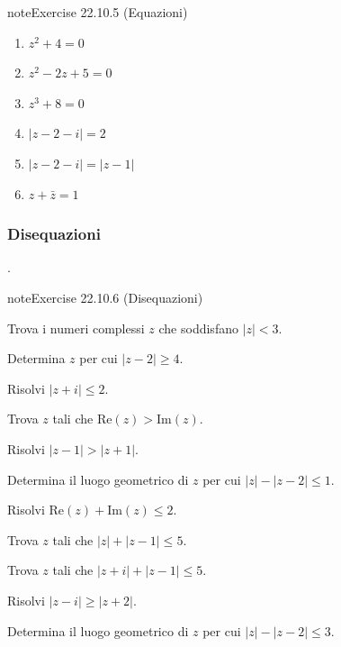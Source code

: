 \documentclass[letterpaper,10pt,italian]{jupyterBook}
\begin{document}
\begin{sphinxadmonition}{note}{Exercise 22.10.5 (Equazioni)}
\begin{enumerate}
\item {} 
\sphinxAtStartPar
\(z^2 + 4 = 0\)

\item {} 
\sphinxAtStartPar
\(z^2 - 2z + 5 = 0\)

\item {} 
\sphinxAtStartPar
\(z^3 + 8 = 0\)

\item {} 
\sphinxAtStartPar
\(|z-2-i| = 2\)

\item {} 
\sphinxAtStartPar
\(|z-2-i| = |z-1|\)

\item {} 
\sphinxAtStartPar
\(z + \bar{z} = 1\)

\end{enumerate}


\end{sphinxadmonition}


\subsubsection{Disequazioni}
\label{\detokenize{ch/algebra/complex-algebra-problems:disequazioni}}\label{\detokenize{ch/algebra/complex-algebra-problems:math-hs-algebra-complex-problems-equations-ineq}}
\sphinxAtStartPar
{\hyperref[\detokenize{ch/algebra/complex-algebra-sol:math-hs-algebra-complex-sol-equations-ineq-sol}]{}}.
 \label{exercise:ch/algebra/complex-algebra-problems-exercise-5}

\begin{sphinxadmonition}{note}{Exercise 22.10.6 (Disequazioni)}



\sphinxAtStartPar
{} Trova i numeri complessi \(z\) che soddisfano \(|z| < 3\).

\sphinxAtStartPar
{} Determina \(z\) per cui \(|z - 2| \geq 4\).

\sphinxAtStartPar
{} Risolvi \(|z + i| \leq 2\).

\sphinxAtStartPar
{} Trova \(z\) tali che \(\text{Re}(z) > \text{Im}(z)\).

\sphinxAtStartPar
{} Risolvi \(|z - 1| > |z + 1|\).

\sphinxAtStartPar
{} Determina il luogo geometrico di \(z\) per cui \(|z| - |z-2| \leq 1\).

\sphinxAtStartPar
{} Risolvi \(\text{Re}(z) + \text{Im}(z) \leq 2\).

\sphinxAtStartPar
{} Trova \(z\) tali che \(|z| + |z - 1| \leq 5\).

\sphinxAtStartPar
{} Trova \(z\) tali che \(|z+i| + |z - 1| \leq 5\).

\sphinxAtStartPar
{} Risolvi \(|z - i| \geq |z + 2|\).

\sphinxAtStartPar
{} Determina il luogo geometrico di \(z\) per cui \(|z| - |z-2| \leq 3\).
\end{sphinxadmonition}
\end{document}
